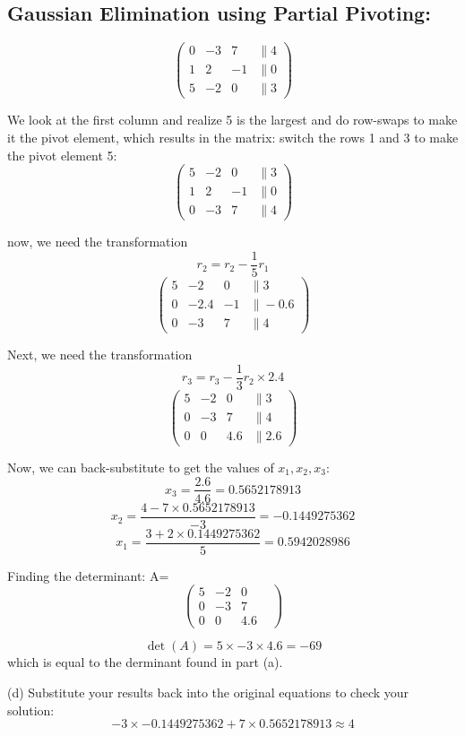 \documentclass{article}
\begin{document}
\subsection{Gaussian Elimination using Partial Pivoting:}
\[
   \begin{pmatrix}
      0 & -3 & 7 & \|4 \\
      1 & 2 & -1 & \|0 \\
      5 & -2 & 0 & \|3
   \end{pmatrix}
\]

We look at the first column and realize 5 is the largest and do row-swaps to make it the pivot element, which results in the matrix:
switch the rows 1 and 3 to make the pivot element 5:
\[
   \begin{pmatrix}
      5 & -2 & 0 & \|3 \\
      1 & 2 & -1 & \|0 \\
      0 & -3 & 7 & \|4
   \end{pmatrix}
\]


now, we need the transformation \[r_2 = r_2 - \frac{1}{5}r_1\]
\[
   \begin{pmatrix}
      5 & -2 & 0 & \|3 \\
      0 & -2.4 & -1 & \|-0.6 \\
      0 & -3 & 7 & \|4
   \end{pmatrix}
\]

Next, we need the transformation \[r_3 = r_3 - \frac{1}{3}r_2\times2.4\]
\[
   \begin{pmatrix}
      5 & -2 & 0 & \|3 \\
      0 & -3 & 7 & \|4 \\
      0 & 0 & 4.6 & \|2.6
   \end{pmatrix}
\]

Now, we can back-substitute to get the values of \(x_1, x_2, x_3\):
\[x_3 = \frac{2.6}{4.6} = 0.5652178913\]
\[x_2 = \frac{4 - 7 \times 0.5652178913}{-3} = -0.1449275362\]
\[x_1 = \frac{3 + 2 \times 0.1449275362}{5} = 0.5942028986\]

Finding the determinant:
A=\[
   \begin{pmatrix}
      5 & -2 & 0 & \\
      0 & -3 & 7 & \\
      0 & 0 & 4.6 &
   \end{pmatrix}
\]

\[
   \det(A) = 5 \times -3 \times 4.6 = -69
\]
which is  equal to the derminant found in part (a).

(d) Substitute your results back into the original equations to check your solution:
\[
   -3 \times -0.1449275362 + 7 \times 0.5652178913 \approx 4
\]
\end{document}
